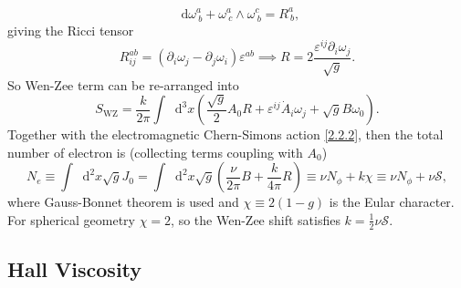 \documentclass[10pt,nofootinbib,letterpaper]{revtex4}
\newcommand*\dd{\mathop{}\!\mathrm{d}}
\begin{document}
		\begin{equation*}
			\dd\omega^a_{~b}+\omega^a_{~c}\wedge\omega^c_{~b}=R^a_{~b},
		\end{equation*}
		giving the Ricci tensor
		\begin{equation*}
			R^{ab}_{ij}=(\partial_i\omega_j-\partial_j\omega_i)\varepsilon^{ab}\implies R=2\dfrac{\varepsilon^{ij}\partial_i\omega_j}{\sqrt{g}}.
		\end{equation*}
		So Wen-Zee term can be re-arranged into
		\begin{equation}\label{2.2.8}
			S_{\text{WZ}}=\dfrac{k}{2\pi}\int\dd^3x\left(\dfrac{\sqrt{g}}{2}A_0R+\varepsilon^{ij}\dot{A}_i\omega_j+\sqrt{g}B\omega_0\right).
		\end{equation}
		Together with the electromagnetic Chern-Simons action \eqref{2.2.2}, then the total number of electron is (collecting terms coupling with $A_0$)
		\begin{equation}\label{2.2.9}
			N_e\equiv\int\dd^2x\sqrt{g}J_0=\int\dd^2x\sqrt{g}\left(\dfrac{\nu}{2\pi}B+\dfrac{k}{4\pi}R\right)\equiv\nu N_\phi+k\chi\equiv\nu N_\phi+\nu\mathcal{S},
		\end{equation}
		where Gauss-Bonnet theorem is used and $\chi\equiv2(1-g)$ is the Eular character. For spherical geometry $\chi=2$, so the Wen-Zee shift satisfies $k=\frac{1}{2}\nu\mathcal{S}$. 






	\subsection{Hall Viscosity}


\end{document}
